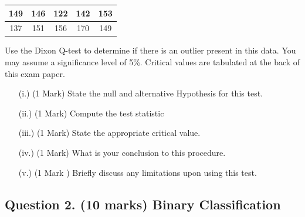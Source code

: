 \documentclass[a4paper,12pt]{article}
\begin{document}
\begin{itemize}
\begin{center}
	\begin{tabular}{|c|c|c|c|c|}
		\hline
		149  & 146 & 122 & 142 &  153\\ \hline
		137 & 151 & 156&   170&  149
		\\ \hline
	\end{tabular}
\end{center}
Use the Dixon Q-test to determine if there is an outlier present in this data. You may assume a significance level of 5\%. Critical values are tabulated at the back of this exam paper.
\begin{itemize}
	\item[(i.)](1 Mark)	State the null and alternative Hypothesis for this test.
	\item[(ii.)](1 Mark) Compute the test statistic
	\item[(iii.)](1 Mark) State the appropriate critical value.
	\item[(iv.)](1 Mark) What is your conclusion to this procedure.
	\item[(v.)] (1 Mark ) Briefly discuss any limitations upon using this test.
\end{itemize}
\end{itemize} 


\newpage
\subsection*{Question 2. (10 marks) Binary Classification }
\end{document}
